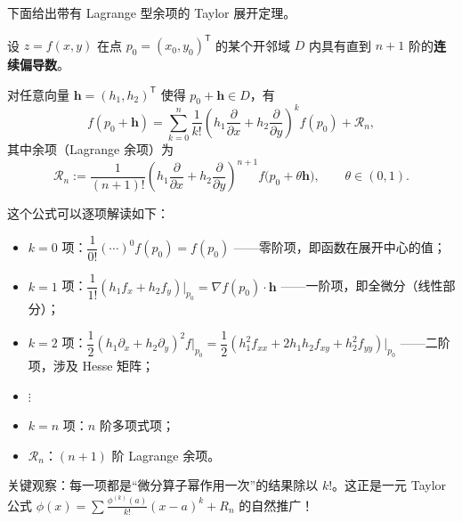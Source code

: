 \documentclass[lang=cn,11pt]{elegantbook}
\begin{document}
下面给出带有 Lagrange 型余项的 Taylor 展开定理。

\begin{theorem} \label{thm:taylor}
设 $z=f(x,y)$ 在点 $p_0=(x_0,y_0)^{\mathsf T}$ 的某个开邻域 $D$ 内具有直到 $n+1$ 阶的\textbf{连续偏导数}。

对任意向量 $\boldsymbol h=(h_1,h_2)^{\mathsf T}$ 使得 $p_0+\boldsymbol h\in D$，有
\[
\boxed{
f(p_0+\boldsymbol h)
=\sum_{k=0}^{n}\frac{1}{k!}\left(h_1\frac{\partial}{\partial x}+h_2\frac{\partial}{\partial y}\right)^{\!k}f(p_0)
+\mathcal R_{n},
}
\]
其中余项（Lagrange 余项）为
\[
\mathcal R_n := \frac{1}{(n+1)!} \left(h_1\frac{\partial}{\partial x}+h_2\frac{\partial}{\partial y}\right)^{\!n+1} f\bigl(p_0+\theta\boldsymbol h\bigr), \qquad \theta\in(0,1).
\]
\end{theorem}

\begin{note}[公式的直观理解]
这个公式可以逐项解读如下：
\begin{itemize}
  \item $k=0$ 项：$\dfrac{1}{0!}(\cdots)^0 f(p_0)=f(p_0)$ ——零阶项，即函数在展开中心的值；
  \item $k=1$ 项：$\dfrac{1}{1!}(h_1f_x+h_2f_y)\big|_{p_0}= \nabla f(p_0)\cdot\boldsymbol h$ ——一阶项，即全微分（线性部分）；
  \item $k=2$ 项：$\dfrac{1}{2}(h_1\partial_x+h_2\partial_y)^2f\big|_{p_0} = \dfrac{1}{2}(h_1^2f_{xx}+2h_1h_2f_{xy}+h_2^2f_{yy})\big|_{p_0}$ ——二阶项，涉及 Hesse 矩阵；
  \item $\vdots$
  \item $k=n$ 项：$n$ 阶多项式项；
  \item $\mathcal R_n$：$(n+1)$ 阶 Lagrange 余项。
\end{itemize}

关键观察：每一项都是“微分算子幂作用一次”的结果除以 $k!$。这正是一元 Taylor 公式 $\phi(x)=\sum\frac{\phi^{(k)}(a)}{k!}(x-a)^k+R_n$ 的自然推广！
\end{note}
\end{document}
